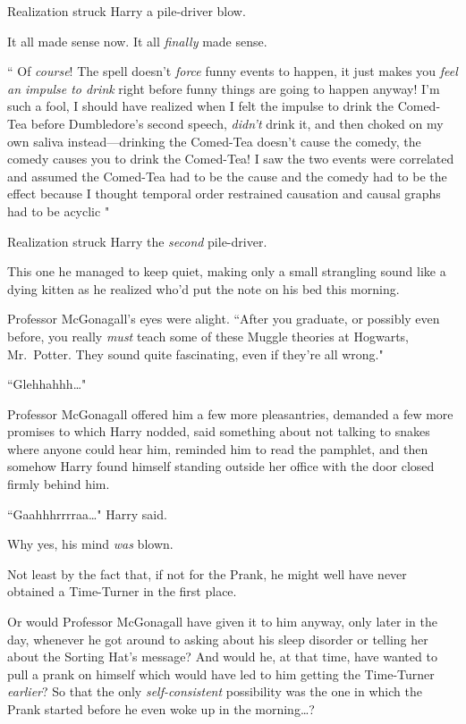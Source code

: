 Realization struck Harry a pile-driver blow.

It all made sense now. It all \emph{finally} made sense.

`` Of \emph{course}! The spell doesn't \emph{force} funny events to happen, it just makes you \emph{feel an impulse to drink} right before funny things are going to happen anyway! I'm such a fool, I should have realized when I felt the impulse to drink the Comed-Tea before Dumbledore's second speech, \emph{didn't} drink it, and then choked on my own saliva instead---drinking the Comed-Tea doesn't cause the comedy, the comedy causes you to drink the Comed-Tea! I saw the two events were correlated and assumed the Comed-Tea had to be the cause and the comedy had to be the effect because I thought temporal order restrained causation and causal graphs had to be acyclic "

Realization struck Harry the \emph{second} pile-driver.

This one he managed to keep quiet, making only a small strangling sound like a dying kitten as he realized who'd put the note on his bed this morning.

Professor McGonagall's eyes were alight. ``After you graduate, or possibly even before, you really \emph{must} teach some of these Muggle theories at Hogwarts, Mr.~Potter. They sound quite fascinating, even if they're all wrong."

``Glehhahhh{\ldots}"

Professor McGonagall offered him a few more pleasantries, demanded a few more promises to which Harry nodded, said something about not talking to snakes where anyone could hear him, reminded him to read the pamphlet, and then somehow Harry found himself standing outside her office with the door closed firmly behind him.

``Gaahhhrrrraa{\ldots}" Harry said.

Why yes, his mind \emph{was} blown.

Not least by the fact that, if not for the Prank, he might well have never obtained a Time-Turner in the first place.

Or would Professor McGonagall have given it to him anyway, only later in the day, whenever he got around to asking about his sleep disorder or telling her about the Sorting Hat's message? And would he, at that time, have wanted to pull a prank on himself which would have led to him getting the Time-Turner \emph{earlier}? So that the only \emph{self-consistent} possibility was the one in which the Prank started before he even woke up in the morning{\ldots}?


